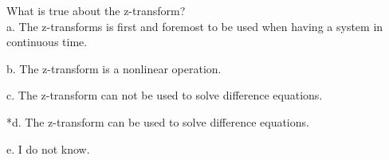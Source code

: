 
What is true about the z-transform? \\

a. The z-transforms is first and foremost to be used when having a
system in continuous time.

b. The z-transform is a nonlinear operation.

c. The z-transform can not be used to solve difference equations.

*d. The z-transform can be used to solve difference equations.

e. I do not know. \\
